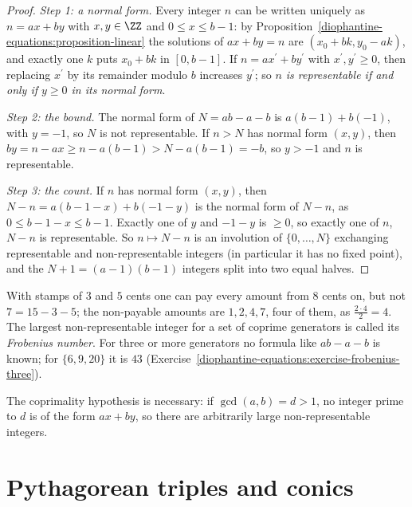\begin{proof}
\emph{Step 1: a normal form.} Every integer $n$ can be written uniquely as $n = ax + by$ with $x, y \in \ZZ$ and $0 \leq x \leq b - 1$: by Proposition~\ref{diophantine-equations:proposition-linear} the
solutions of $ax + by = n$ are $(x_0 + bk, y_0 - ak)$, and exactly one $k$ puts $x_0 + bk$ in $[0, b - 1]$. If $n = ax^{\prime} + by^{\prime}$ with $x^{\prime}, y^{\prime} \geq 0$, then replacing $x^{\prime}$ by its
remainder modulo $b$ increases $y^{\prime}$; so \emph{$n$ is representable if and only if $y \geq 0$ in its normal form}.

\emph{Step 2: the bound.} The normal form of $N = ab - a - b$ is $a(b - 1) + b(-1)$, with $y = -1$, so $N$ is not representable. If $n > N$ has normal form $(x, y)$, then
$by = n - ax \geq n - a(b - 1) > N - a(b - 1) = -b$, so $y > -1$ and $n$ is representable.

\emph{Step 3: the count.} If $n$ has normal form $(x, y)$, then $N - n = a(b - 1 - x) + b(-1 - y)$ is the normal form of $N - n$, as $0 \leq b - 1 - x \leq b - 1$. Exactly one of $y$ and $-1 - y$ is $\geq 0$, so
exactly one of $n$, $N - n$ is representable. So $n \mapsto N - n$ is an involution of $\{0, \dots, N\}$ exchanging representable and non-representable integers (in particular it has no fixed point), and the
$N + 1 = (a - 1)(b - 1)$ integers split into two equal halves.
\end{proof}

\begin{example}\label{diophantine-equations:example-frobenius}
With stamps of $3$ and $5$ cents one can pay every amount from $8$ cents on, but not $7 = 15 - 3 - 5$; the non-payable amounts are $1, 2, 4, 7$, four of them, as $\frac{2 \cdot 4}{2} = 4$. The largest
non-representable integer for a set of coprime generators is called its \emph{Frobenius number}. For three or more generators no formula like $ab - a - b$ is known; for $\{6, 9, 20\}$ it is $43$
(Exercise~\ref{diophantine-equations:exercise-frobenius-three}).
\end{example}

\begin{counterexample}\label{diophantine-equations:counterexample-frobenius}
The coprimality hypothesis is necessary: if $\gcd(a, b) = d > 1$, no integer prime to $d$ is of the form $ax + by$, so there are arbitrarily large non-representable integers.
\end{counterexample}

\section{Pythagorean triples and conics}\label{diophantine-equations:section-conics}

